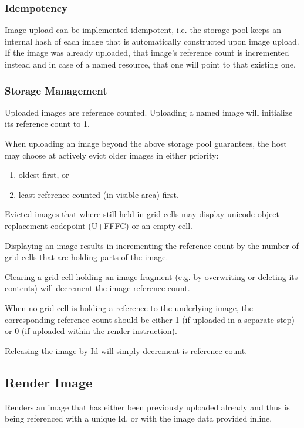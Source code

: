 \documentclass{article}
\begin{document}
\subsubsection{Idempotency}

Image upload can be implemented idempotent, i.e. the storage pool keeps an internal hash
of each image that is automatically constructed upon image upload.
If the image was already uploaded, that image's reference count is incremented instead
and in case of a named resource, that one will point to that existing one.

\subsubsection{Storage Management}

Uploaded images are reference counted. Uploading a named image will initialize its reference count to 1.

When uploading an image beyond the above storage pool guarantees,
the host may choose at actively evict older images in either priority:

\begin{enumerate}
    \item oldest first, or
    \item least reference counted (in visible area) first.
\end{enumerate}

Evicted images that where still held in grid cells may display unicode object replacement
codepoint (U+FFFC) or an empty cell.

Displaying an image results in incrementing the reference count by the number of grid cells
that are holding parts of the image.

Clearing a grid cell holding an image fragment (e.g. by overwriting or deleting its contents)
will decrement the image reference count.

When no grid cell is holding a reference to the underlying image,
the corresponding reference count should be either 1 (if uploaded in a separate step)
or 0 (if uploaded within the render instruction).

Releasing the image by Id will simply decrement is reference count.

\subsection{Render Image}

Renders an image that has either been previously uploaded already and thus is being referenced
with a unique Id, or with the image data provided inline.
\end{document}

